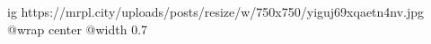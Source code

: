  
 
 
 
 

\ifcmt
  ig https://mrpl.city/uploads/posts/resize/w/750x750/yiguj69xqaetn4nv.jpg
  @wrap center
  @width 0.7
\fi
